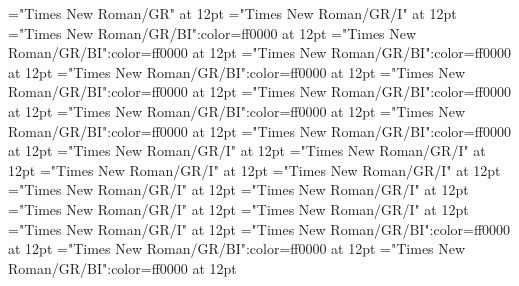 \documentclass[a4paper]{article}
\begin{document}
\pagestyle{plain}
\sloppy
\setlength{\parfillskip}{0pt plus 1fil}
\font\sectionletter="Times New Roman/GR" at 12pt
\font\articlesectionletter="Times New Roman/GR/I" at 12pt
\font\firstoftypesensearticlesectionletter="Times New Roman/GR/BI":color=ff0000 at 12pt
\font\firstoftypegrammarcategorylastoftypefirstoftypesensearticlesectionletter="Times New Roman/GR/BI":color=ff0000 at 12pt
\font{}="Times New Roman/GR/BI":color=ff0000 at 12pt
\font\firstoftypelastoftypewordusedefinitionfirstoftypelastoftypefirstoftypesensearticlesectionletter="Times New Roman/GR/BI":color=ff0000 at 12pt
\font\lastoftypesensearticlesectionletter="Times New Roman/GR/BI":color=ff0000 at 12pt
\font\firstoftypegrammarcategorylastoftypelastoftypesensearticlesectionletter="Times New Roman/GR/BI":color=ff0000 at 12pt
\font{}="Times New Roman/GR/BI":color=ff0000 at 12pt
\font\firstoftypelastoftypewordusedefinitionfirstoftypelastoftypelastoftypesensearticlesectionletter="Times New Roman/GR/BI":color=ff0000 at 12pt
\font\examplefirstoftypelastoftypelastoftypesensearticlesectionletter="Times New Roman/GR/BI":color=ff0000 at 12pt
\font\firstoftypelastoftypesubentryarticlesectionletter="Times New Roman/GR/I" at 12pt
\font\firstoftypeheadwordlastoftypefirstoftypelastoftypesubentryarticlesectionletter="Times New Roman/GR/I" at 12pt
\font\examplefirstoftypelastoftypefirstoftypelastoftypesubentryarticlesectionletter="Times New Roman/GR/I" at 12pt
\font\firstoftypeheadwordlastoftypearticlesectionletter="Times New Roman/GR/I" at 12pt
\font\firstoftypelastoftypepronunciationarticlesectionletter="Times New Roman/GR/I" at 12pt
\font\firstoftypelastoftypestressfirstoftypelastoftypepronunciationarticlesectionletter="Times New Roman/GR/I" at 12pt
\font\firstoftypevariantinflectionarticlesectionletter="Times New Roman/GR/I" at 12pt
\font\variantinflectionarticlesectionletter="Times New Roman/GR/I" at 12pt
\font\lastoftypevariantinflectionarticlesectionletter="Times New Roman/GR/I" at 12pt
\font\exampleusefirstoftypelastoftypefirstoftypesensearticlesectionletter="Times New Roman/GR/BI":color=ff0000 at 12pt
\font\examplefirstoftypelastoftypefirstoftypesensearticlesectionletter="Times New Roman/GR/BI":color=ff0000 at 12pt
\font\exampleusefirstoftypelastoftypelastoftypesensearticlesectionletter="Times New Roman/GR/BI":color=ff0000 at 12pt

\mbox{} 
\newpage 
\newpage 
\setcounter{page}{1} 
\pagestyle{fancy} 
\end{document}
